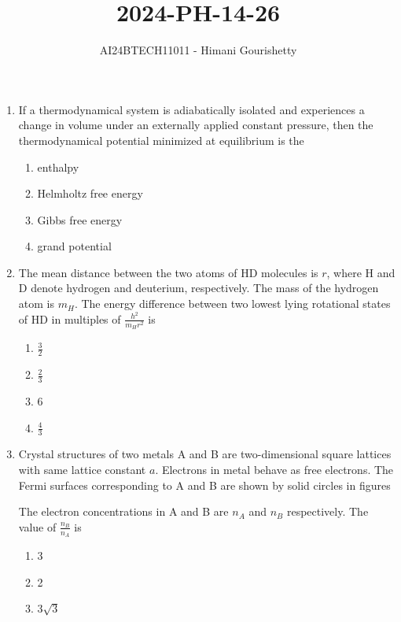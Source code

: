 \documentclass[journal,12pt,onecolumn]{IEEEtran}
\theoremstyle{remark}
\begin{document}

\vspace{3cm}

\title{2024-PH-14-26}
\author{AI24BTECH11011 - Himani Gourishetty}
\maketitle
\bigskip

\renewcommand{\thefigure}{\theenumi}
\renewcommand{\thetable}{\theenumi}
\begin{enumerate}
\item If a thermodynamical system is adiabatically isolated and experiences a change in volume under an externally applied constant pressure, then the thermodynamical potential minimized at equilibrium is the
\begin{enumerate}
    \item enthalpy
    \item Helmholtz free energy
    \item Gibbs free energy
    \item grand potential
\end{enumerate}
\item The mean distance between the two atoms of HD molecules is $r$, where H and D denote hydrogen and deuterium, respectively. The mass of the hydrogen atom is $m_H$. The energy difference between two lowest lying rotational states of HD in multiples of $\frac{h^2}{m_Hr^2}$ is
\begin{enumerate}
    \item $\frac{3}{2}$
    \item $\frac{2}{3}$
    \item 6
    \item $\frac{4}{3}$
\end{enumerate}
\item Crystal structures of two metals A and B are two-dimensional square lattices with same lattice constant $a$. Electrons in metal behave as free electrons. The Fermi surfaces corresponding to A and B are shown by solid circles in figures
\begin{figure}[!ht]
\centering
\resizebox{0.5\textwidth}{!}{%

}%
\end{figure}
The electron concentrations in A and B are $n_A$ and $n_B$ respectively. The value of $\frac{n_B}{n_A}$ is
\begin{enumerate}
    \item 3
    \item 2
    \item $3\sqrt{3}$

\end{enumerate}
\end{enumerate}
\end{document}

